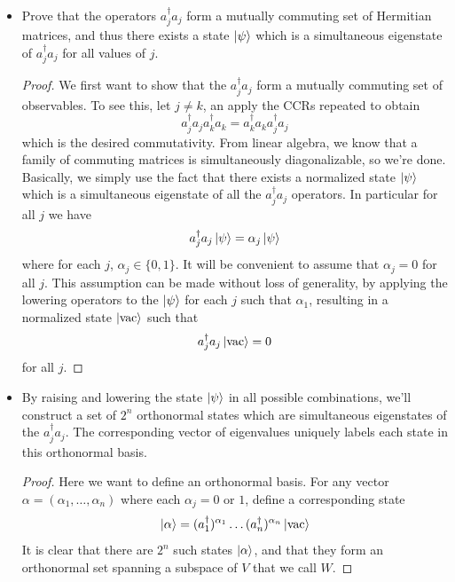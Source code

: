 \documentclass{book}
\theoremstyle{definition}
\newcommand{\al}{\alpha}
\begin{document}
\begin{itemize}
	\begin{proof}
		The proofs are not too hard (when in doubt, use the CCRs), so I  will leave them to the reader.
	\end{proof}
	
	
	\item Prove that the operators $a^\dagger_j a_j$ form a mutually commuting set of Hermitian matrices, and thus there exists a state $\ket{\psi}$ which is a simultaneous eigenstate of $a^\dagger_j a_j$ for all values of $j$.
	
	
	\begin{proof}
		We first want to show that the $a_j^\dagger a_j$ form a mutually commuting set of observables. To see this, let $j\neq k$, an apply the CCRs repeated to obtain
		\begin{equation}
		a_j^\dagger a_j a_k^\dagger a_k = a_k^\dagger a_k a_j^\dagger a_j
		\end{equation}
		which is the desired commutativity. From linear algebra, we know that a family of commuting matrices is simultaneously diagonalizable, so we're done. Basically, we simply use the fact that there exists a normalized state $\ket{\psi}$ which is a simultaneous eigenstate of all the $a_j^\dagger a_j$ operators. In particular for all $j$ we have
		\begin{equation}
		a_j^\dagger a_j \ket{\psi} = \al_j \ket{\psi}
		\end{equation}
		where for each $j$, $\al_j \in \{ 0,1 \}$. It will be convenient to assume that $ \al_j  = 0$ for all $j$. This assumption can be made without loss of generality, by applying the lowering operators to the $\ket{\psi}$ for each $j$ such that $\al_1$, resulting in a normalized state $\ket{\text{vac}}$ such that 
		\begin{equation}
		a_j^\dagger a_j \ket{\text{vac}} = 0 
		\end{equation}
		for all $j$. 
	\end{proof}
	
	
	\item By raising and lowering the state $\ket{\psi}$ in all possible combinations, we'll construct a set of $2^n$ orthonormal states which are simultaneous eigenstates of the $a_j^\dagger a_j$. The corresponding vector of eigenvalues uniquely labels each state in this orthonormal basis. 
	
	\begin{proof}
		Here we want to define an orthonormal basis. For any vector $\al = (\al_1,\dots,\al_n)$ where each $\al_j = 0$ or $1$, define a corresponding state
		\begin{equation}
		\ket{\al} = (a_1^\dagger)^{\al_1}\dots (a_n^\dagger)^{\al_n}\ket{\text{vac}}
		\end{equation}
		It is clear that there are $2^n$ such states $\ket{\al}$, and that they form an orthonormal set spanning a subspace of $V$ that we call $W$. 
	\end{proof}
	

\end{itemize}
\end{document}
